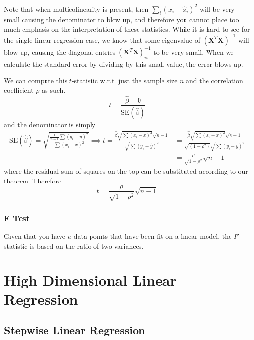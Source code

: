 \documentclass{article}
\begin{document}
      Note that when multicolinearity is present, then $\sum_{i} (x_i - \hat{x}_i)^2$ will be very small causing the denominator to blow up, and therefore you cannot place too much emphasis on the interpretation of these statistics. While it is hard to see for the single linear regression case, we know that some eigenvalue of $(\mathbf{X}^T \mathbf{X})^{-1}$ will blow up, causing the diagonal entries $(\mathbf{X}^T \mathbf{X})^{-1}_{ii}$ to be very small. When we calculate the standard error by dividing by this small value, the error blows up. 

      \begin{theorem}
      We can compute this $t$-statistic w.r.t. just the sample size $n$ and the correlation coefficient $\rho$ as such. 
      \[t = \frac{\hat{\beta} - 0}{\mathrm{SE}(\hat{\beta})}\]
      and the denominator is simply 
      \begin{align*}
        \mathrm{SE}(\hat{\beta}) = \sqrt{\frac{\frac{1}{n-1} \sum (y_i - \hat{y})^2}{\sum (x_i - \bar{x})^2}} \implies t = \frac{\hat{\beta} \sqrt{\sum (x_i - \bar{x})^2} \sqrt{n-1}}{\sqrt{\sum (y_i - \hat{y})^2}} & = \frac{\hat{\beta} \sqrt{\sum (x_i - \bar{x})^2} \sqrt{n-1}}{\sqrt{(1 - \rho^2)} \sqrt{\sum (y_i - \bar{y})^2}} \\ & = \frac{\rho}{\sqrt{1 - \rho^2}} \sqrt{n-1}
      \end{align*}
      where the residual sum of squares on the top can be substituted according to our theorem. Therefore 
      \begin{equation}
        t = \frac{\rho}{\sqrt{1 - \rho^2}} \sqrt{n-1}
      \end{equation}
      \end{theorem}

    \subsubsection{F Test}

      Given that you have $n$ data points that have been fit on a linear model, the $F$-statistic is based on the ratio of two variances. 

\section{High Dimensional Linear Regression}

  \subsection{Stepwise Linear Regression} 
\end{document}
